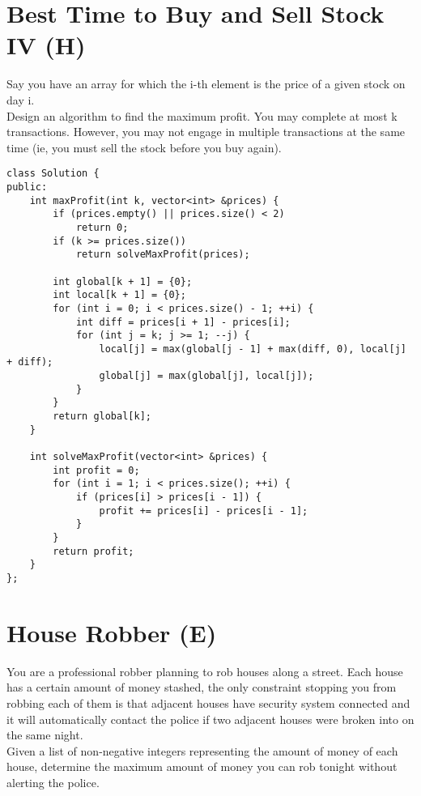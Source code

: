 \section{Best Time to Buy and Sell Stock IV (H)}
Say you have an array for which the i-th element is the price of a given stock on day i. \\

Design an algorithm to find the maximum profit. You may complete at most k transactions. However, you may not engage in multiple transactions at the same time (ie, you must sell the stock before you buy again). \\

\begin{lstlisting}
class Solution {
public:
    int maxProfit(int k, vector<int> &prices) {
        if (prices.empty() || prices.size() < 2) 
            return 0;
        if (k >= prices.size()) 
            return solveMaxProfit(prices);
        
        int global[k + 1] = {0};
        int local[k + 1] = {0};
        for (int i = 0; i < prices.size() - 1; ++i) {
            int diff = prices[i + 1] - prices[i];
            for (int j = k; j >= 1; --j) {
                local[j] = max(global[j - 1] + max(diff, 0), local[j] + diff);
                global[j] = max(global[j], local[j]);
            }
        }
        return global[k];
    }
    
    int solveMaxProfit(vector<int> &prices) {
        int profit = 0;
        for (int i = 1; i < prices.size(); ++i) {
            if (prices[i] > prices[i - 1]) {
                profit += prices[i] - prices[i - 1];
            }
        }
        return profit;
    }
};
\end{lstlisting}


\section{House Robber (E)}
You are a professional robber planning to rob houses along a street. Each house has a certain amount of money stashed, the only constraint stopping you from robbing each of them is that adjacent houses have security system connected and it will automatically contact the police if two adjacent houses were broken into on the same night. \\

Given a list of non-negative integers representing the amount of money of each house, determine the maximum amount of money you can rob tonight without alerting the police. \\

